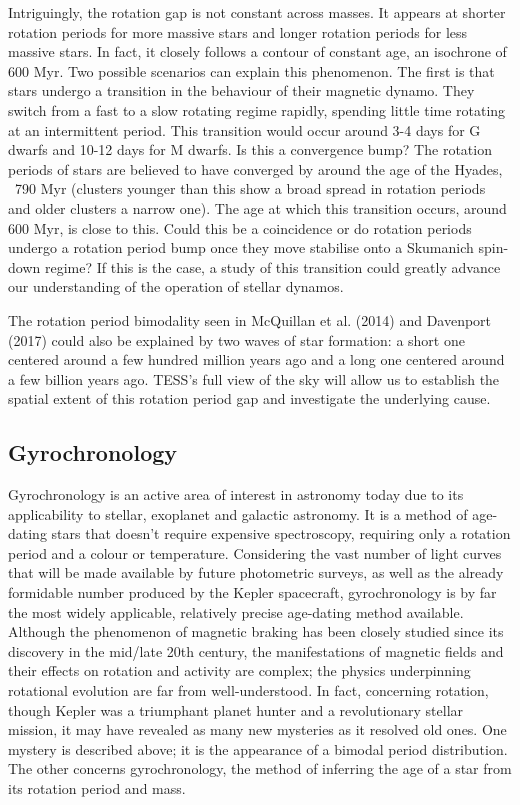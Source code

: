 \documentclass[useAMS, usenatbib, preprint, 12pt]{aastex}
\begin{document}
Intriguingly, the rotation gap is not constant across masses.
It appears at shorter rotation periods for more massive stars and longer
rotation periods for less massive stars.
In fact, it closely follows a contour of constant age, an isochrone of 600
Myr.
Two possible scenarios can explain this phenomenon.
The first is that stars undergo a transition in the behaviour of their
magnetic dynamo.
They switch from a fast to a slow rotating regime rapidly, spending little
time rotating at an intermittent period.
This transition would occur around 3-4 days for G dwarfs and 10-12 days for M
dwarfs.
Is this a convergence bump?
The rotation periods of stars are believed to have converged by around the age
of the Hyades, ~790 Myr (clusters younger than this show a broad spread in
rotation periods and older clusters a narrow one).
The age at which this transition occurs, around 600 Myr, is close to this.
Could this be a coincidence or do rotation periods undergo a rotation period
bump once they move stabilise onto a Skumanich spin-down regime?
If this is the case, a study of this transition could greatly advance our
understanding of the operation of stellar dynamos.

The rotation period bimodality seen in McQuillan et al. (2014) and Davenport
(2017) could also be explained by two waves of star formation: a short one
centered around a few hundred million years ago and a long one centered around
a few billion years ago.
TESS’s full view of the sky will allow us to establish the spatial extent of
this rotation period gap and investigate the underlying cause.

\subsection{Gyrochronology}

Gyrochronology is an active area of interest in astronomy today due to its applicability to stellar, exoplanet and galactic astronomy.
It is a method of age-dating stars that doesn’t require expensive
spectroscopy, requiring only a rotation period and a colour or temperature.
Considering the vast number of light curves that will be made available by
future photometric surveys, as well as the already formidable number produced
by the Kepler spacecraft, gyrochronology is by far the most widely applicable,
relatively precise age-dating method available.
Although the phenomenon of magnetic braking has been closely studied since its
discovery in the mid/late 20th century, the manifestations of magnetic fields
and their effects on rotation and activity are complex; the physics
underpinning rotational evolution are far from well-understood.
In fact, concerning rotation, though Kepler was a triumphant planet hunter and
a revolutionary stellar mission, it may have revealed as many new mysteries as
it resolved old ones.
One mystery is described above; it is the appearance of a bimodal period
distribution.
The other concerns gyrochronology, the method of inferring the age of a star
from its rotation period and mass.
\end{document}
